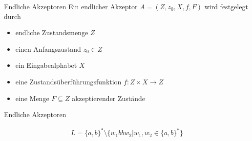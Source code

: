 \begin{frame}{Endliche Akzeptoren}
  Ein endlicher Akzeptor $A = (Z, z_{0}, X, f, F)$ wird festgelegt durch
  \begin{itemize}
    \item endliche Zustandsmenge $Z$
    \item einen Anfangszustand $z_{0} \in Z$
    \item ein Eingabealphabet $X$
    \item eine Zustands\"uberf\"uhrungsfunktion $f: Z \times X \rightarrow Z$
    \item eine Menge $F \subseteq Z$ akzeptierender Zust\"ande
  \end{itemize}					
\end{frame}

\begin{frame}{Endliche Akzeptoren}
  \begin{center}
  \end{center}
  \pause
  \begin{align*}
    L=\{a,b\}^*\setminus \{w_1bbw_2|w_1,w_2\in \{a,b\}^*\}
  \end{align*}
\end{frame}

